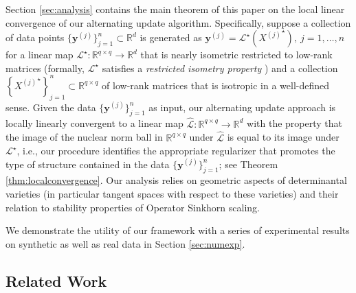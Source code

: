 \documentclass[11pt,letterpaper]{article}
\newcommand{\R}{\mathbb{R}}
\newcommand{\by}{\mathbf{y}}
\renewcommand{\L}{\mathcal{L}}
\begin{document}
Section \ref{sec:analysis} contains the main theorem of this paper on the local linear convergence of our alternating update algorithm.  Specifically, suppose a collection of data points $\{\by^{(j)}\}_{j=1}^n \subset \R^d$ is generated as $\by^{(j)} = \L^\star \left({X^{(j)}}^\star \right), ~ j=1,\dots,n$ for a linear map $\L^\star : \R^{q \times q} \rightarrow \R^d$ that is nearly isometric restricted to low-rank matrices (formally, $\L^\star$ satisfies a \emph{restricted isometry property} \cite{RFP:10}) and a collection $\left\{{X^{(j)}}^\star \right\}_{j=1}^n \subset \R^{q \times q}$ of low-rank matrices that is isotropic in a well-defined sense.  Given the data $\{\by^{(j)}\}_{j=1}^n$ as input, our alternating update approach is locally linearly convergent to a linear map $\hat{\L} : \R^{q \times q} \rightarrow \R^d$ with the property that the image of the nuclear norm ball in $\R^{q \times q}$ under $\hat{\L}$ is equal to its image under $\L^\star$, i.e., our procedure identifies the appropriate regularizer that promotes the type of structure contained in the data $\{\by^{(j)}\}_{j=1}^n$; see Theorem \ref{thm:localconvergence}.  Our analysis relies on geometric aspects of determinantal varieties (in particular tangent spaces with respect to these varieties) and their relation to stability properties of Operator Sinkhorn scaling.

We demonstrate the utility of our framework with a series of experimental results on synthetic as well as real data in Section \ref{sec:numexp}.

\subsection{Related Work} \label{sec:intro_relatedwork}

\end{document}
